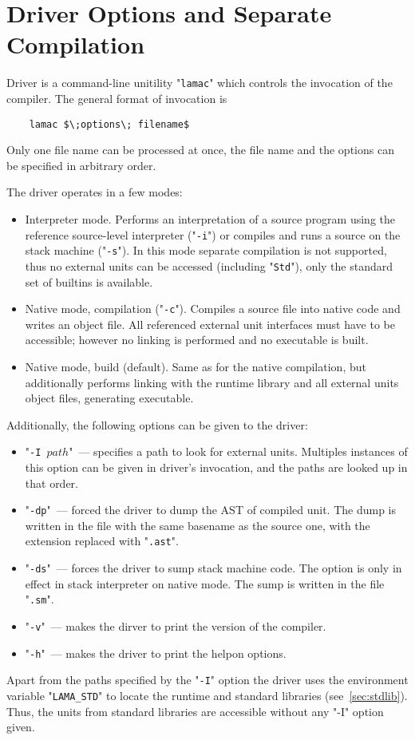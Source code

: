 \chapter{Driver Options and Separate Compilation}
\label{sec:driver}

Driver is a command-line unitility "\texttt{lamac}" which controls the invocation of the compiler. The
general format of invocation is

\begin{lstlisting}
    lamac $\;options\; filename$
\end{lstlisting}

Only one file name can be processed at once, the file name and the options can be specified in
arbitrary order.

The driver operates in a few modes:

\begin{itemize}
\item Interpreter mode. Performs an interpretation of a source program using the reference source-level interpreter ("\texttt{-i}") or
  compiles and runs a source on the stack machine ("\texttt{-s}"). In this mode separate compilation is not supported, thus no external
  units can be accessed (including "\lstinline|Std|"), only the standard set of builtins is available. 
\item Native mode, compilation ("\lstinline{-c}"). Compiles a source file into native code and writes an object file. All referenced
  external unit interfaces must have to be accessible; however no linking is performed and no executable is built.
\item Native mode, build (default). Same as for the native compilation, but additionally performs linking with the runtime library and
  all external units object files, generating executable.
\end{itemize}

Additionally, the following options can be given to the driver:

\begin{itemize}
\item "\texttt{-I $path$}"~--- specifies a path to look for external units. Multiples instances of this option can be given in driver's
  invocation, and the paths are looked up in that order.
\item "\texttt{-dp}"~--- forced the driver to dump the AST of compiled unit. The dump is written in the file with the same
  basename as the source one, with the extension replaced with "\texttt{.ast}".
\item "\texttt{-ds}"~--- forces the driver to sump stack machine code. The option is only in effect in stack interpreter on
  native mode. The sump is written in the file "\texttt{.sm}".
\item "\texttt{-v}"~--- makes the dirver to print the version of the compiler.
\item "\texttt{-h}"~--- makes the driver to print the helpon options.
\end{itemize}

Apart from the paths specified by the "\texttt{-I}" option the driver uses the environment variable "\texttt{LAMA\_STD}"
to locate the runtime and standard libraries (see~\ref{sec:stdlib}). Thus, the units from standard libraries are accessible
without any "-I" option given.
